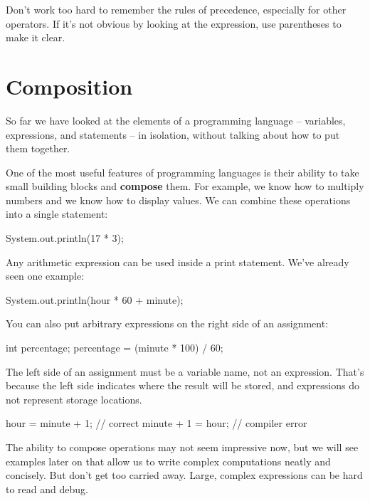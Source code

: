 \documentclass[12pt]{book}
\theoremstyle{exercise}
\begin{document}
Don't work too hard to remember the rules of precedence, especially for other operators.
If it's not obvious by looking at the expression, use parentheses to make it clear.


\section{Composition}



So far we have looked at the elements of a programming language -- variables, expressions, and statements -- in isolation, without talking about how to put them together.

One of the most useful features of programming languages is their ability to take small building blocks and {\bf compose} them.
For example, we know how to multiply numbers and we know how to display values.
We can combine these operations into a single statement:

\begin{code}
    System.out.println(17 * 3);
\end{code}

Any arithmetic expression can be used inside a print statement.
We've already seen one example:

\begin{code}
    System.out.println(hour * 60 + minute);
\end{code}

You can also put arbitrary expressions on the right side of an assignment:

\begin{code}
    int percentage;
    percentage = (minute * 100) / 60;
\end{code}

The left side of an assignment must be a variable name, not an expression.
That's because the left side indicates where the result will be stored, and expressions do not represent storage locations.

\begin{code}
    hour = minute + 1;  // correct
    minute + 1 = hour;  // compiler error
\end{code}


The ability to compose operations may not seem impressive now, but we will see examples later on that allow us to write complex computations neatly and concisely.
But don't get too carried away.
Large, complex expressions can be hard to read and debug.
\end{document}
